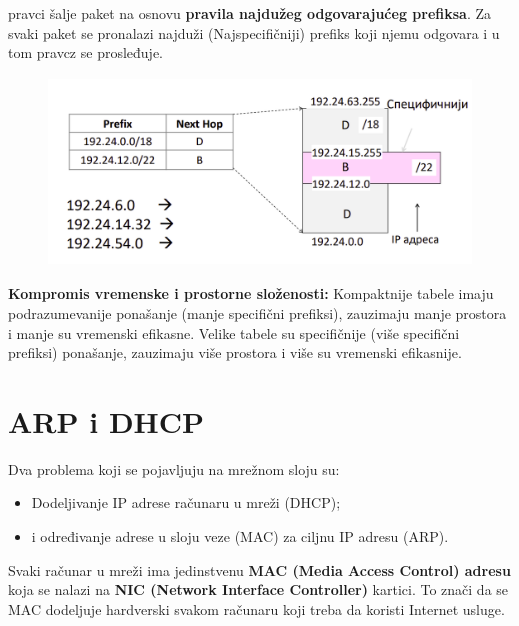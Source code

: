 \documentclass[a4paper]{article}
\begin{document}
    pravci šalje paket na osnovu \textbf{pravila najdužeg odgovarajućeg prefiksa}. Za svaki paket
    se pronalazi najduži (Najspecifičniji) prefiks koji njemu odgovara i u tom pravcz
    se prosleđuje.
    \begin{figure}[H]
        \begin{center}
            \includegraphics[width=120mm,height=50mm]{Slike/cidr2.png}
        \end{center}
    \end{figure}
    \textbf{Kompromis vremenske i prostorne složenosti:} Kompaktnije tabele imaju podrazumevanije
    ponašanje (manje specifični prefiksi), zauzimaju manje prostora i manje su vremenski efikasne.
    Velike tabele su specifičnije (više specifični prefiksi) ponašanje, zauzimaju više prostora
    i više su vremenski efikasnije.

\section{ARP i DHCP}
    Dva problema koji se pojavljuju na mrežnom sloju su:
    \begin{itemize}
        \item Dodeljivanje IP adrese računaru u mreži (DHCP);
        \item i određivanje adrese u sloju veze (MAC) za ciljnu IP adresu (ARP).
    \end{itemize}

    Svaki računar u mreži ima jedinstvenu \textbf{MAC (Media Access Control) adresu} koja se nalazi
    na \textbf{NIC (Network Interface Controller)} kartici. To znači da se MAC dodeljuje hardverski svakom
    računaru koji treba da koristi Internet usluge.
\end{document}
